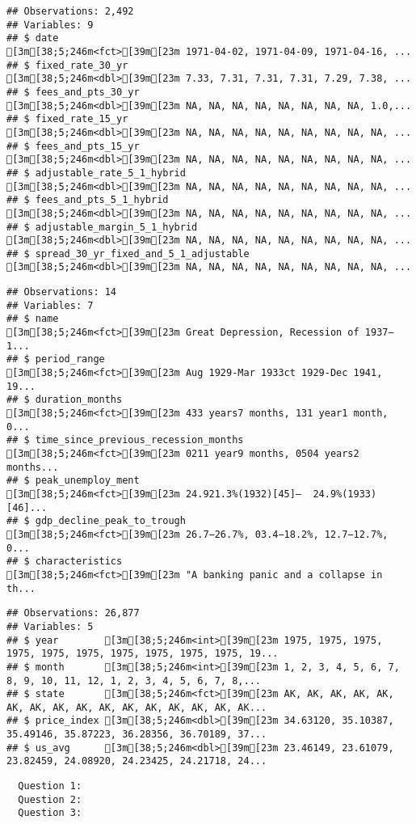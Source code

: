 \documentclass[
]{article}
\begin{document}
\begin{verbatim}
## Observations: 2,492
## Variables: 9
## $ date                                  [3m[38;5;246m<fct>[39m[23m 1971-04-02, 1971-04-09, 1971-04-16, ...
## $ fixed_rate_30_yr                      [3m[38;5;246m<dbl>[39m[23m 7.33, 7.31, 7.31, 7.31, 7.29, 7.38, ...
## $ fees_and_pts_30_yr                    [3m[38;5;246m<dbl>[39m[23m NA, NA, NA, NA, NA, NA, NA, NA, 1.0,...
## $ fixed_rate_15_yr                      [3m[38;5;246m<dbl>[39m[23m NA, NA, NA, NA, NA, NA, NA, NA, NA, ...
## $ fees_and_pts_15_yr                    [3m[38;5;246m<dbl>[39m[23m NA, NA, NA, NA, NA, NA, NA, NA, NA, ...
## $ adjustable_rate_5_1_hybrid            [3m[38;5;246m<dbl>[39m[23m NA, NA, NA, NA, NA, NA, NA, NA, NA, ...
## $ fees_and_pts_5_1_hybrid               [3m[38;5;246m<dbl>[39m[23m NA, NA, NA, NA, NA, NA, NA, NA, NA, ...
## $ adjustable_margin_5_1_hybrid          [3m[38;5;246m<dbl>[39m[23m NA, NA, NA, NA, NA, NA, NA, NA, NA, ...
## $ spread_30_yr_fixed_and_5_1_adjustable [3m[38;5;246m<dbl>[39m[23m NA, NA, NA, NA, NA, NA, NA, NA, NA, ...
\end{verbatim}

\begin{verbatim}
## Observations: 14
## Variables: 7
## $ name                                 [3m[38;5;246m<fct>[39m[23m Great Depression, Recession of 1937–1...
## $ period_range                         [3m[38;5;246m<fct>[39m[23m Aug 1929-Mar 1933ct 1929-Dec 1941, 19...
## $ duration_months                      [3m[38;5;246m<fct>[39m[23m 433 years7 months, 131 year1 month, 0...
## $ time_since_previous_recession_months [3m[38;5;246m<fct>[39m[23m 0211 year9 months, 0504 years2 months...
## $ peak_unemploy_ment                   [3m[38;5;246m<fct>[39m[23m 24.921.3%(1932)[45]–  24.9%(1933)[46]...
## $ gdp_decline_peak_to_trough           [3m[38;5;246m<fct>[39m[23m 26.7−26.7%, 03.4−18.2%, 12.7−12.7%, 0...
## $ characteristics                      [3m[38;5;246m<fct>[39m[23m "A banking panic and a collapse in th...
\end{verbatim}

\begin{verbatim}
## Observations: 26,877
## Variables: 5
## $ year        [3m[38;5;246m<int>[39m[23m 1975, 1975, 1975, 1975, 1975, 1975, 1975, 1975, 1975, 1975, 19...
## $ month       [3m[38;5;246m<int>[39m[23m 1, 2, 3, 4, 5, 6, 7, 8, 9, 10, 11, 12, 1, 2, 3, 4, 5, 6, 7, 8,...
## $ state       [3m[38;5;246m<fct>[39m[23m AK, AK, AK, AK, AK, AK, AK, AK, AK, AK, AK, AK, AK, AK, AK, AK...
## $ price_index [3m[38;5;246m<dbl>[39m[23m 34.63120, 35.10387, 35.49146, 35.87223, 36.28356, 36.70189, 37...
## $ us_avg      [3m[38;5;246m<dbl>[39m[23m 23.46149, 23.61079, 23.82459, 24.08920, 24.23425, 24.21718, 24...
\end{verbatim}

\begin{verbatim}
  Question 1:
  Question 2:
  Question 3:
\end{verbatim}
\end{document}
